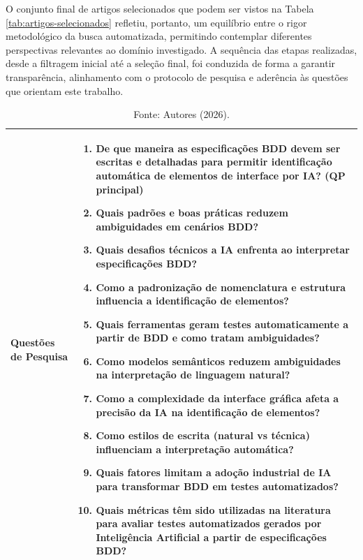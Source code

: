 O conjunto final de artigos selecionados que podem ser vistos na Tabela \ref{tab:artigos-selecionados} refletiu, portanto, um equilíbrio entre o rigor metodológico da busca automatizada, permitindo contemplar diferentes perspectivas relevantes ao domínio investigado. A sequência das etapas realizadas, desde a filtragem inicial até a seleção final, foi conduzida de forma a garantir transparência, alinhamento com o protocolo de pesquisa e aderência às questões que orientam este trabalho.

\begin{table}
\centering
\caption{Questões de Pesquisa}
\label{tab:questoes-pesquisa}
\begin{tabular}{|p{4cm}|p{11cm}|}
\hline
\textbf{Questões de Pesquisa} & 
\begin{enumerate}
    \item De que maneira as especificações BDD devem ser escritas e detalhadas para permitir identificação automática de elementos de interface por IA? (QP principal)
    \item Quais padrões e boas práticas reduzem ambiguidades em cenários BDD?
    \item Quais desafios técnicos a IA enfrenta ao interpretar especificações BDD?
    \item Como a padronização de nomenclatura e estrutura influencia a identificação de elementos?
    \item Quais ferramentas geram testes automaticamente a partir de BDD e como tratam ambiguidades?
    \item Como modelos semânticos reduzem ambiguidades na interpretação de linguagem natural?
    \item Como a complexidade da interface gráfica afeta a precisão da IA na identificação de elementos?
    \item Como estilos de escrita (natural vs técnica) influenciam a interpretação automática?
    \item Quais fatores limitam a adoção industrial de IA para transformar BDD em testes automatizados?
    \item Quais métricas têm sido utilizadas na literatura para avaliar testes automatizados gerados por Inteligência Artificial a partir de especificações BDD?
\end{enumerate}
\\ \hline
\end{tabular}
\begin{center}\caption*{Fonte: Autores (2026).}\end{center}
\end{table}



